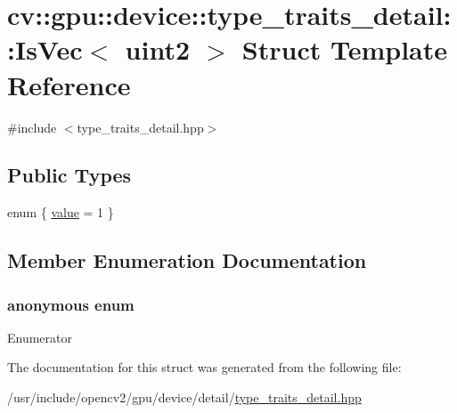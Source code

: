 \hypertarget{structcv_1_1gpu_1_1device_1_1type__traits__detail_1_1IsVec_3_01uint2_01_4}{\section{cv\-:\-:gpu\-:\-:device\-:\-:type\-\_\-traits\-\_\-detail\-:\-:Is\-Vec$<$ uint2 $>$ Struct Template Reference}
\label{structcv_1_1gpu_1_1device_1_1type__traits__detail_1_1IsVec_3_01uint2_01_4}
}


{\ttfamily \#include $<$type\-\_\-traits\-\_\-detail.\-hpp$>$}

\subsection*{Public Types}
\begin{DoxyCompactItemize}
\item 
enum \{ \hyperlink{structcv_1_1gpu_1_1device_1_1type__traits__detail_1_1IsVec_3_01uint2_01_4_ac28ea02f37b9ef65680e796a81020991ac3ec1849de145a41d1b84e1097b2108e}{value} = 1
 \}
\end{DoxyCompactItemize}


\subsection{Member Enumeration Documentation}
\hypertarget{structcv_1_1gpu_1_1device_1_1type__traits__detail_1_1IsVec_3_01uint2_01_4_ac28ea02f37b9ef65680e796a81020991}{\subsubsection[{anonymous enum}]{\setlength{\rightskip}{0pt plus 5cm}anonymous enum}}\label{structcv_1_1gpu_1_1device_1_1type__traits__detail_1_1IsVec_3_01uint2_01_4_ac28ea02f37b9ef65680e796a81020991}
\begin{Desc}
\item[Enumerator]\par
\begin{description}
\item[{\em 
\hypertarget{structcv_1_1gpu_1_1device_1_1type__traits__detail_1_1IsVec_3_01uint2_01_4_ac28ea02f37b9ef65680e796a81020991ac3ec1849de145a41d1b84e1097b2108e}{value}\label{structcv_1_1gpu_1_1device_1_1type__traits__detail_1_1IsVec_3_01uint2_01_4_ac28ea02f37b9ef65680e796a81020991ac3ec1849de145a41d1b84e1097b2108e}
}]\end{description}
\end{Desc}


The documentation for this struct was generated from the following file\-:\begin{DoxyCompactItemize}
\item 
/usr/include/opencv2/gpu/device/detail/\hyperlink{type__traits__detail_8hpp}{type\-\_\-traits\-\_\-detail.\-hpp}\end{DoxyCompactItemize}
